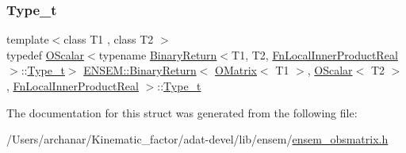 \subsubsection{\texorpdfstring{Type\_t}{Type\_t}\hspace{0.1cm}{\footnotesize\ttfamily [3/3]}}
{\footnotesize\ttfamily template$<$class T1 , class T2 $>$ \\
typedef \mbox{\hyperlink{classENSEM_1_1OScalar}{O\+Scalar}}$<$typename \mbox{\hyperlink{structENSEM_1_1BinaryReturn}{Binary\+Return}}$<$T1, T2, \mbox{\hyperlink{structENSEM_1_1FnLocalInnerProductReal}{Fn\+Local\+Inner\+Product\+Real}}$>$\+::\mbox{\hyperlink{structENSEM_1_1BinaryReturn_3_01OMatrix_3_01T1_01_4_00_01OScalar_3_01T2_01_4_00_01FnLocalInnerProductReal_01_4_a4dca9fd1aa942a0da9d64b937f1e7639}{Type\+\_\+t}}$>$ \mbox{\hyperlink{structENSEM_1_1BinaryReturn}{E\+N\+S\+E\+M\+::\+Binary\+Return}}$<$ \mbox{\hyperlink{classENSEM_1_1OMatrix}{O\+Matrix}}$<$ T1 $>$, \mbox{\hyperlink{classENSEM_1_1OScalar}{O\+Scalar}}$<$ T2 $>$, \mbox{\hyperlink{structENSEM_1_1FnLocalInnerProductReal}{Fn\+Local\+Inner\+Product\+Real}} $>$\+::\mbox{\hyperlink{structENSEM_1_1BinaryReturn_3_01OMatrix_3_01T1_01_4_00_01OScalar_3_01T2_01_4_00_01FnLocalInnerProductReal_01_4_a4dca9fd1aa942a0da9d64b937f1e7639}{Type\+\_\+t}}}



The documentation for this struct was generated from the following file\+:\begin{DoxyCompactItemize}
\item 
/\+Users/archanar/\+Kinematic\+\_\+factor/adat-\/devel/lib/ensem/\mbox{\hyperlink{adat-devel_2lib_2ensem_2ensem__obsmatrix_8h}{ensem\+\_\+obsmatrix.\+h}}\end{DoxyCompactItemize}

